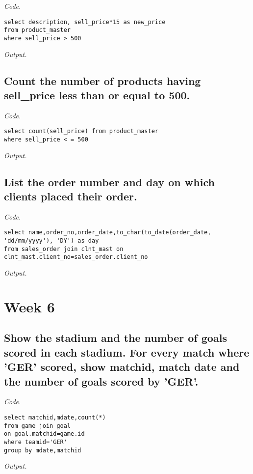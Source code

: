 \documentclass[12pt]{article}
\begin{document}
\textit{Code.}

\begin{lstlisting}
select description, sell_price*15 as new_price 
from product_master
where sell_price > 500
\end{lstlisting}

\textit{Output.}\\

\subsection{Count the number of products having sell\_price less than or equal to 500.}

\textit{Code.}

\begin{lstlisting}
select count(sell_price) from product_master
where sell_price < = 500
\end{lstlisting}

\textit{Output.}\\

\subsection{List the order number and day on which clients placed their order.}

\textit{Code.}

\begin{lstlisting}
select name,order_no,order_date,to_char(to_date(order_date,
'dd/mm/yyyy'), 'DY') as day
from sales_order join clnt_mast on 
clnt_mast.client_no=sales_order.client_no
\end{lstlisting}

\textit{Output.}\\

\section{Week 6}

\subsection{Show the stadium and the number of goals scored in each stadium. For every match where 'GER' scored, show matchid, match date and the number of goals scored by 'GER'.}

\textit{Code.}

\begin{lstlisting}
select matchid,mdate,count(*)
from game join goal 
on goal.matchid=game.id
where teamid='GER'
group by mdate,matchid
\end{lstlisting}

\textit{Output.}\\
\end{document}
